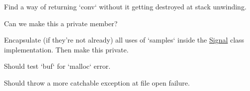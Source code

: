 \begin{DoxyRefList}
\-Find a way of returning `conv` without it getting destroyed at stack unwinding.  
\item[\label{todo__todo000016}%
\hypertarget{todo__todo000016}{}%
\-Member \hyperlink{classSignal_ad07ccb1653bcd36f89f095c7bf7ae877}{\-Signal\-:\-:sample\-\_\-rate} ]\-Can we make this a private member?  
\item[\label{todo__todo000015}%
\hypertarget{todo__todo000015}{}%
\-Member \hyperlink{classSignal_a8a51dd9d0f5937b3f3406e66a4d8fc57}{\-Signal\-:\-:samples} ]\-Encapsulate (if they're not already) all uses of `samples` inside the \hyperlink{classSignal}{\-Signal} class implementation. \-Then make this private.  
\item[\label{todo__todo000007}%
\hypertarget{todo__todo000007}{}%
\-Member \hyperlink{classSignal_a790a11398e80a3dc45150929d125c106}{\-Signal\-:\-:\-Signal} (std\-::string filename)]\-Should test `buf` for `malloc` error.

\-Should throw a more catchable exception at file open failure. 
\end{DoxyRefList}